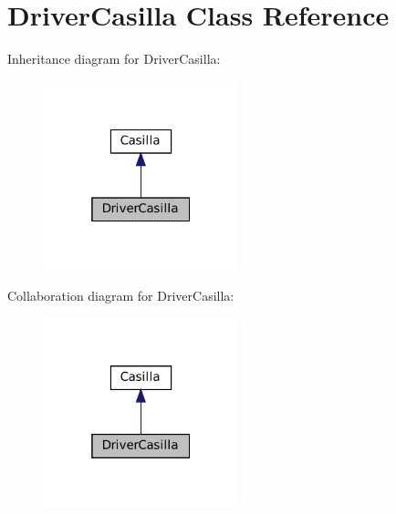 \section{Driver\+Casilla Class Reference}
\label{class_dominio_1_1controladores_1_1_drivers_1_1_driver_casilla}


Inheritance diagram for Driver\+Casilla\+:
\nopagebreak
\begin{figure}[H]
\begin{center}
\leavevmode
\includegraphics[width=160pt]{class_dominio_1_1controladores_1_1_drivers_1_1_driver_casilla__inherit__graph}
\end{center}
\end{figure}


Collaboration diagram for Driver\+Casilla\+:
\nopagebreak
\begin{figure}[H]
\begin{center}
\leavevmode
\includegraphics[width=160pt]{class_dominio_1_1controladores_1_1_drivers_1_1_driver_casilla__coll__graph}
\end{center}
\end{figure}
